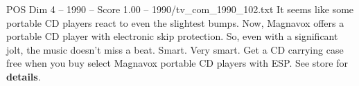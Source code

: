 \begin{textsample}{POS Dim 4 – 1990 – Score 1.00 – 1990/tv\_com\_1990\_102.txt}  \label{ex:f4_pos_024}
It seems like some portable CD players react to even the slightest bumps.
Now, Magnavox offers a portable CD player with electronic skip protection.
So, even with a significant jolt, the music doesn't miss a beat.
Smart.
Very smart.
Get a CD carrying case free when you buy select Magnavox portable CD players with ESP.
See store for \textbf{details}.

\end{textsample}
